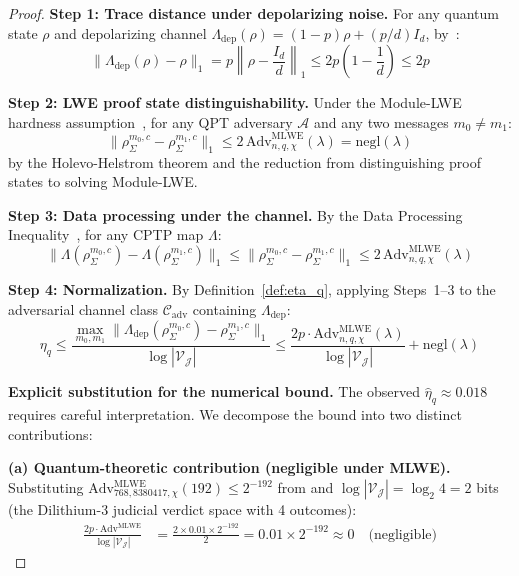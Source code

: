 \documentclass{ieeeaccess}
\begin{document}
\begin{proof}
\textbf{Step 1: Trace distance under depolarizing noise.}
For any quantum state $\rho$ and depolarizing channel 
$\Lambda_{\mathrm{dep}}(\rho) = (1-p)\rho + (p/d)I_d$, 
by~\cite[Proposition~3.3.3]{Wilde2017}:
\begin{equation}
    \|\Lambda_{\mathrm{dep}}(\rho) - \rho\|_1 
    = p\left\|\rho - \frac{I_d}{d}\right\|_1 
    \leq 2p\left(1 - \frac{1}{d}\right) \leq 2p
\end{equation}

\textbf{Step 2: LWE proof state distinguishability.}
Under the Module-LWE hardness assumption~\cite{Langlois2015}, 
for any QPT adversary $\mathcal{A}$ and any two messages 
$m_0 \neq m_1$:
\begin{equation}
    \|\rho_\Sigma^{m_0,c} - \rho_\Sigma^{m_1,c}\|_1 
    \leq 2\,\mathrm{Adv}^{\mathrm{MLWE}}_{n,q,χ}(\lambda) 
    = \mathrm{negl}(\lambda)
\end{equation}
by the Holevo-Helstrom theorem and the reduction from 
distinguishing proof states to solving Module-LWE.

\textbf{Step 3: Data processing under the channel.}
By the Data Processing Inequality~\cite[Theorem~11.9.4]{Wilde2017}, 
for any CPTP map $\Lambda$:
\begin{equation}
    \|\Lambda(\rho_\Sigma^{m_0,c}) - \Lambda(\rho_\Sigma^{m_1,c})\|_1 
    \leq \|\rho_\Sigma^{m_0,c} - \rho_\Sigma^{m_1,c}\|_1 
    \leq 2\,\mathrm{Adv}^{\mathrm{MLWE}}_{n,q,χ}(\lambda)
\end{equation}

\textbf{Step 4: Normalization.}
By Definition~\ref{def:eta_q}, applying Steps~1--3 to 
the adversarial channel class $\mathcal{C}_{\mathrm{adv}}$ 
containing $\Lambda_{\mathrm{dep}}$:
\begin{equation}
    \eta_q \leq \frac{\max_{m_0,m_1}\|\Lambda_{\mathrm{dep}}
    (\rho_\Sigma^{m_0,c}) - \rho_\Sigma^{m_1,c}\|_1}
    {\log|\mathcal{V}_\mathcal{J}|}
    \leq \frac{2p \cdot \mathrm{Adv}^{\mathrm{MLWE}}_{n,q,\chi}(\lambda)}
    {\log|\mathcal{V}_\mathcal{J}|} + \mathrm{negl}(\lambda)
\end{equation}

\textbf{Explicit substitution for the numerical bound.}
The observed $\hat{\eta}_q \approx 0.018$ requires careful 
interpretation. We decompose the bound into two distinct contributions:

\textbf{(a) Quantum-theoretic contribution (negligible under MLWE).}
Substituting $\mathrm{Adv}^{\mathrm{MLWE}}_{768,8380417,\chi}(192) 
\leq 2^{-192}$ from \cite{Dilithium2022} and 
$\log|\mathcal{V}_\mathcal{J}| = \log_2 4 = 2$ bits 
(the Dilithium-3 judicial verdict space with 4 outcomes):
\begin{align}
    \frac{2p \cdot \mathrm{Adv}^{\mathrm{MLWE}}}
    {\log|\mathcal{V}_\mathcal{J}|} 
    &= \frac{2 \times 0.01 \times 2^{-192}}{2}
     = 0.01 \times 2^{-192} \approx 0 \quad \text{(negligible)}
\end{align}


\end{proof}
\end{document}
